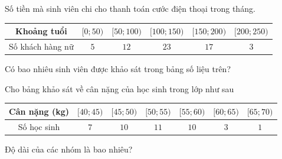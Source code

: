 \begin{ex}%
	Số tiền mà sinh viên chi cho thanh toán cước điện thoại  trong tháng.
	\begin{center}
		\begin{tabular}{|c|c|c|c|c|c|}
			 \hline
			Khoảng  tuổi & $[0;50)$ & $[50;100)$ & $[100;150)$ & $[150;200)$& $[200;250)$\\
			 \hline
			Số khách hàng nữ & $5$ &  $12$ & $23$ & $17$ & $3$ \\
			\hline 
		\end{tabular}
	\end{center}
	Có bao nhiêu sinh viên  được khảo sát trong bảng số liệu trên?
\end{ex}

\begin{ex}%
	Cho bảng khảo sát  về cân nặng của học sinh trong lớp như sau
	\begin{center}
		\begin{tabular}{|c|c|c|c|c|c|c|}
			\hline 
			Cân nặng (kg)& $[40;45)$& $[45;50)$& $[50;55)$& $[55;60)$& $[60;65)$  & $[65;70)$ \\
			 \hline
			Số học sinh& $7$ & $10$ & $11$ & $10$ & $3$  & $1$\\
			\hline 
		\end{tabular}
	\end{center}
	\textbf{}Độ dài của các nhóm là  bao nhiêu?
\end{ex}

